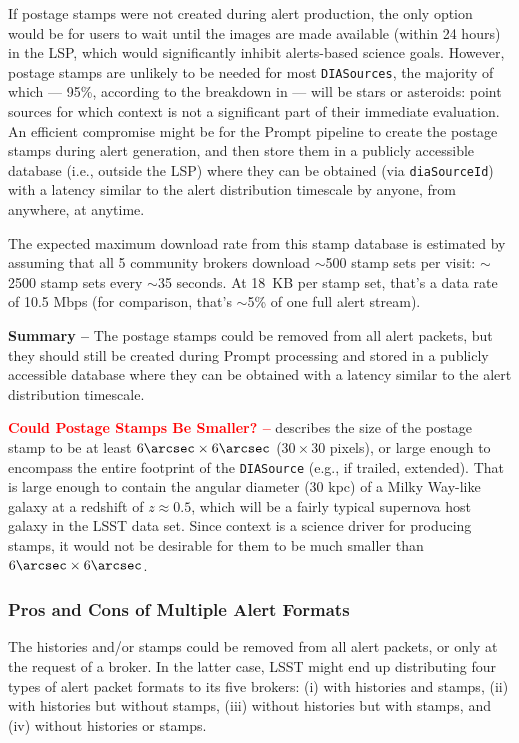 \documentclass[DM,lsstdraft,authoryear,toc]{lsstdoc}
\begin{document}
If postage stamps were not created during alert production, the only option would be for users to wait until the images are made available (within 24 hours) in the LSP, which would significantly inhibit alerts-based science goals.
However, postage stamps are unlikely to be needed for most {\tt DIASources}, the majority of which --- 95\%, according to the breakdown in  --- will be stars or asteroids: point sources for which context is not a significant part of their immediate evaluation.
An efficient compromise might be for the Prompt pipeline to create the postage stamps during alert generation, and then store them in a publicly accessible database (i.e., outside the LSP) where they can be obtained (via {\tt diaSourceId}) with a latency similar to the alert distribution timescale by anyone, from anywhere, at anytime. 

The expected maximum download rate from this stamp database is estimated by assuming that all 5 community brokers download $\sim$500 stamp sets per visit: $\sim$2500 stamp sets every $\sim$35 seconds.
At 18~KB per stamp set, that's a data rate of 10.5 Mbps (for comparison, that's $\sim$5\% of one full alert stream).

{\bf Summary --} The postage stamps could be removed from all alert packets, but they should still be created during Prompt processing and stored in a publicly accessible database where they can be obtained with a latency similar to the alert distribution timescale.

\textcolor{red}{{\bf Could Postage Stamps Be Smaller? --}}
 describes the size of the postage stamp to be at least $6\arcsec \times 6\arcsec$ ($30\times30$ pixels), or large enough to encompass the entire footprint of the {\tt DIASource} (e.g., if trailed, extended). 
That is large enough to contain the angular diameter (30 kpc) of a Milky Way-like galaxy at a redshift of $z\approx0.5$, which will be a fairly typical supernova host galaxy in the LSST data set.
Since context is a science driver for producing stamps, it would not be desirable for them to be much smaller than $6\arcsec \times 6\arcsec$.


\subsubsection{Pros and Cons of Multiple Alert Formats}\label{sssec:packets_remove_procon}

The histories and/or stamps could be removed from all alert packets, or only at the request of a broker.
In the latter case, LSST might end up distributing four types of alert packet formats to its five brokers: (i) with histories and stamps, (ii) with histories but without stamps, (iii) without histories but with stamps, and (iv) without histories or stamps. 
\end{document}

